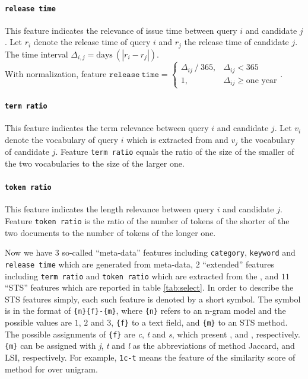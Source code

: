 \paragraph{\texttt{release time}} 

This feature indicates the relevance of issue time between query $i$ and candidate $j$. Let $r_i$ denote the release time of query $i$ and $r_j$ the release time of candidate $j$. The time interval $\Delta_{i,j}=\text{days}~(|r_i - r_j|)$. \\ With normalization, feature $\mathtt{release~time} = \begin{cases} \Delta_{ij}~/~365, & \Delta_{ij} < 365 \\ 1, & \Delta_{ij} \ge \text{one year} \end{cases}$. 

\paragraph{\texttt{term ratio}} 

This feature indicates the term relevance between query $i$ and candidate $j$. Let $v_i$ denote the vocabulary of query $i$ which is extracted from \icontent{} and $v_j$ the vocabulary of candidate $j$. Feature \texttt{term ratio} equals the ratio of the size of the smaller of the two vocabularies to the size of the larger one. 

\paragraph{\texttt{token ratio}} This feature indicates the length relevance between query $i$ and candidate $j$. Feature \texttt{token ratio} is the ratio of the number of tokens of the shorter of the two \icontent{} documents to the number of tokens of the longer one. 

Now we have $3$ so-called ``meta-data'' features including \texttt{category}, \texttt{keyword} and \texttt{release time} which are generated from meta-data, $2$ ``extended'' features including \texttt{term ratio} and \texttt{token ratio} which are extracted from the \icontent{}, and $11$ ``STS'' features which are reported in table \ref{tab:select}. In order to describe the STS features simply, each such feature is denoted by a short symbol. The symbol is in the format of \texttt{\{n\}\{f\}-\{m\}}, where \texttt{\{n\}} refers to an n-gram model and the possible values are $1$, $2$ and $3$, \texttt{\{f\}} to a text field, and \texttt{\{m\}} to an STS method. The possible assignments of \texttt{\{f\}} are \textit{c}, \textit{t} and \textit{s}, which present \icontent{}, \ititle{} and \isummary{}, respectively. \texttt{\{m\}} can be assigned with \textit{j}, \textit{t} and \textit{l} as the abbreviations of method Jaccard, \tfidf{} and LSI, respectively. For example, \texttt{1c-t} means the feature of the similarity score of method \tfidf{} for \icontent{} over unigram.


